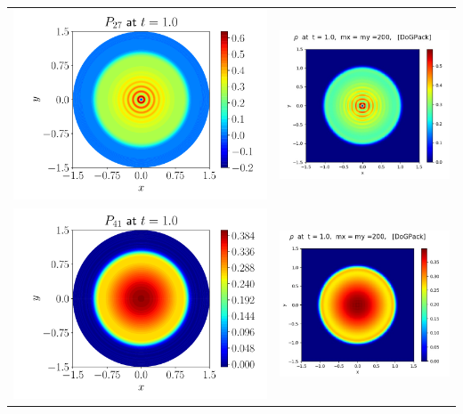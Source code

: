 \begin{center}
\begin{tabular}{c|c}
    \includegraphics[height=0.4\linewidth]{figures/physical_final_p27.pdf} &
    \includegraphics[height=0.4\linewidth]{figures/Minwoo_p27.png} \\
    \includegraphics[height=0.4\linewidth]{figures/physical_final_p41.pdf} &
    \includegraphics[height=0.4\linewidth]{figures/Minwoo_p41.png}
\end{tabular}
\end{center}    
